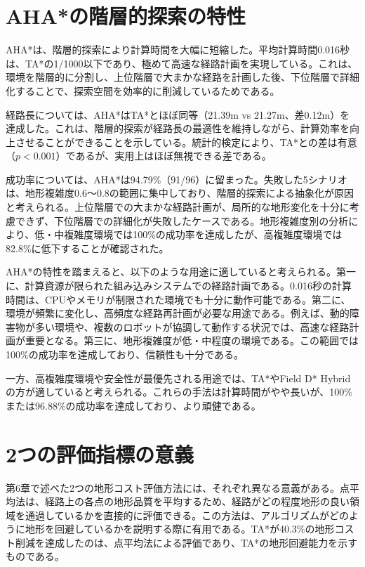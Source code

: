 \section{AHA*の階層的探索の特性}

AHA*は、階層的探索により計算時間を大幅に短縮した。平均計算時間0.016秒は、TA*の1/1000以下であり、極めて高速な経路計画を実現している。これは、環境を階層的に分割し、上位階層で大まかな経路を計画した後、下位階層で詳細化することで、探索空間を効率的に削減しているためである。

経路長については、AHA*はTA*とほぼ同等（21.39m vs 21.27m、差0.12m）を達成した。これは、階層的探索が経路長の最適性を維持しながら、計算効率を向上させることができることを示している。統計的検定により、TA*との差は有意（$p<0.001$）であるが、実用上はほぼ無視できる差である。

成功率については、AHA*は94.79\%（91/96）に留まった。失敗した5シナリオは、地形複雑度0.6～0.8の範囲に集中しており、階層的探索による抽象化が原因と考えられる。上位階層での大まかな経路計画が、局所的な地形変化を十分に考慮できず、下位階層での詳細化が失敗したケースである。地形複雑度別の分析により、低・中複雑度環境では100\%の成功率を達成したが、高複雑度環境では82.8\%に低下することが確認された。

AHA*の特性を踏まえると、以下のような用途に適していると考えられる。第一に、計算資源が限られた組み込みシステムでの経路計画である。0.016秒の計算時間は、CPUやメモリが制限された環境でも十分に動作可能である。第二に、環境が頻繁に変化し、高頻度な経路再計画が必要な用途である。例えば、動的障害物が多い環境や、複数のロボットが協調して動作する状況では、高速な経路計画が重要となる。第三に、地形複雑度が低・中程度の環境である。この範囲では100\%の成功率を達成しており、信頼性も十分である。

一方、高複雑度環境や安全性が最優先される用途では、TA*やField D* Hybridの方が適していると考えられる。これらの手法は計算時間がやや長いが、100\%または96.88\%の成功率を達成しており、より頑健である。

\section{2つの評価指標の意義}

第6章で述べた2つの地形コスト評価方法には、それぞれ異なる意義がある。点平均法は、経路上の各点の地形品質を平均するため、経路がどの程度地形の良い領域を通過しているかを直接的に評価できる。この方法は、アルゴリズムがどのように地形を回避しているかを説明する際に有用である。TA*が40.3\%の地形コスト削減を達成したのは、点平均法による評価であり、TA*の地形回避能力を示すものである。

